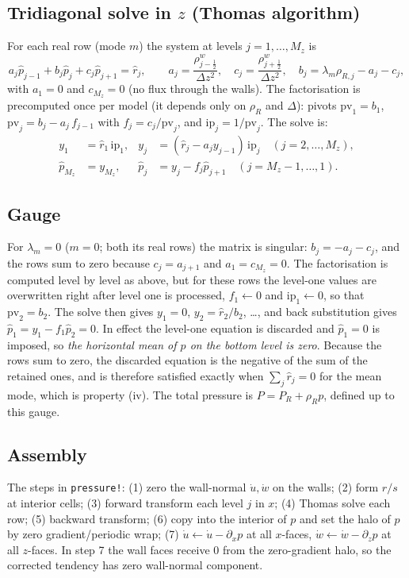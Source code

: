 \documentclass[11pt,a4paper]{article}
\newcommand{\code}[1]{\texttt{#1}}
\begin{document}
\subsection{Tridiagonal solve in $z$ (Thomas algorithm)}
For each real row (mode $m$) the system at levels $j=1,\dots,M_z$ is
\begin{equation}
  a_j\hat p_{j-1}+b_j\hat p_j+c_j\hat p_{j+1}=\hat r_j,\qquad
  a_j=\frac{\rho^w_{j-\frac12}}{\Delta z^2},\quad c_j=\frac{\rho^w_{j+\frac12}}{\Delta z^2},\quad b_j=\lambda_m\rho_{R,j}-a_j-c_j,
\end{equation}
with $a_1=0$ and $c_{M_z}=0$ (no flux through the walls). The factorisation is precomputed once per model (it depends only on $\rho_R$ and $\Delta$): pivots $\mathrm{pv}_1=b_1$, $\mathrm{pv}_j=b_j-a_j\,f_{j-1}$ with $f_j=c_j/\mathrm{pv}_j$, and $\mathrm{ip}_j=1/\mathrm{pv}_j$. The solve is:
\begin{align}
  y_1&=\hat r_1\,\mathrm{ip}_1, & y_j&=(\hat r_j-a_jy_{j-1})\,\mathrm{ip}_j\quad(j=2,\dots,M_z),\\
  \hat p_{M_z}&=y_{M_z}, & \hat p_j&=y_j-f_j\hat p_{j+1}\quad(j=M_z-1,\dots,1).
\end{align}

\subsection{Gauge}
For $\lambda_m=0$ ($m=0$; both its real rows) the matrix is singular: $b_j=-a_j-c_j$, and the rows sum to zero because $c_j=a_{j+1}$ and $a_1=c_{M_z}=0$.
The factorisation is computed level by level as above, but for these rows the level-one values are overwritten right after level one is processed, $f_1\leftarrow0$ and $\mathrm{ip}_1\leftarrow0$, so that $\mathrm{pv}_2=b_2$. The solve then gives $y_1=0$, $y_2=\hat r_2/b_2$, \dots, and back substitution gives
$\hat p_1=y_1-f_1\hat p_2=0$. In effect the level-one equation is discarded and $\hat p_1=0$ is imposed, so \emph{the horizontal mean of $p$ on the bottom level is zero}. Because the rows sum to zero, the discarded equation is the negative of the sum of the retained ones,
and is therefore satisfied exactly when $\sum_j\hat r_j=0$ for the mean mode, which is property (iv). The total pressure is $P=P_R+\rho_Rp$, defined up to this gauge.

\subsection{Assembly}
The steps in \code{pressure!}: (1) zero the wall-normal $\dot u,\dot w$ on the walls; (2) form $r/s$ at interior cells; (3) forward transform each level $j$ in $x$; (4) Thomas solve each row; (5) backward transform;
(6) copy into the interior of $p$ and set the halo of $p$ by zero gradient/periodic wrap; (7) $\dot u\leftarrow\dot u-\partial_xp$ at all $x$-faces, $\dot w\leftarrow\dot w-\partial_zp$ at all $z$-faces.
In step 7 the wall faces receive $0$ from the zero-gradient halo, so the corrected tendency has zero wall-normal component.
\end{document}
